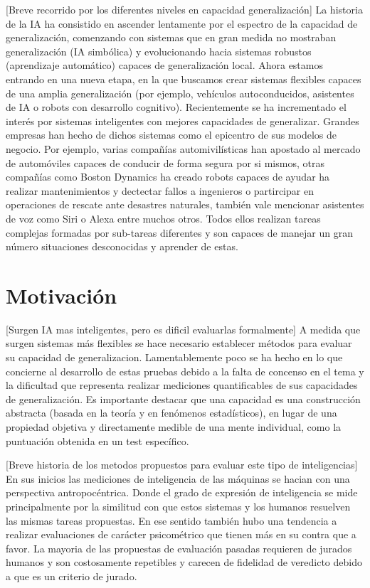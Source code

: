 [Breve recorrido por los diferentes niveles en capacidad generalización]
La historia de la IA ha consistido en ascender lentamente por el espectro de la capacidad de generalización, comenzando con sistemas que en gran medida no mostraban generalización (IA simbólica) y evolucionando hacia sistemas robustos (aprendizaje automático) capaces de generalización local. Ahora estamos entrando en una nueva etapa, en la que buscamos crear sistemas flexibles capaces de una amplia generalización (por ejemplo, vehículos autoconducidos, asistentes de IA o robots con desarrollo cognitivo). Recientemente se ha incrementado el interés por sistemas inteligentes con mejores capacidades de generalizar. Grandes empresas han hecho de dichos sistemas como el epicentro de sus modelos de negocio. Por ejemplo, varias compañías automivilísticas han apostado al mercado de automóviles capaces de conducir de forma segura por si mismos, otras compañías como Boston Dynamics ha creado robots capaces de ayudar ha realizar mantenimientos y dectectar fallos a ingenieros o partircipar en operaciones de rescate ante desastres naturales, también vale mencionar asistentes de voz como Siri o Alexa entre muchos otros. Todos ellos realizan tareas complejas formadas por sub-tareas diferentes y son capaces de manejar un gran número situaciones desconocidas y aprender de estas.

\section*{Motivación}

[Surgen IA mas inteligentes, pero es dificil evaluarlas formalmente]
A medida que surgen sistemas más flexibles se hace necesario establecer métodos para evaluar su capacidad de generalizacion. Lamentablemente poco se ha hecho en lo que concierne al desarrollo de estas pruebas debido a la falta de concenso en el tema y la dificultad que representa realizar mediciones quantificables de sus capacidades de generalización. Es importante destacar que una capacidad es una construcción abstracta (basada en la teoría y en fenómenos estadísticos), en lugar de una propiedad objetiva y directamente medible de una mente individual, como la puntuación obtenida en un test específico.

[Breve historia de los metodos propuestos para evaluar este tipo de inteligencias]
En sus inicios las mediciones de inteligencia de las máquinas se hacian con una perspectiva antropocéntrica. Donde el grado de expresión de inteligencia se mide principalmente por la similitud con que estos sistemas y los humanos resuelven las mismas tareas propuestas. En ese sentido también hubo una tendencia a realizar evaluaciones de carácter psicométrico que tienen más en su contra que a favor. La mayoria de las propuestas de evaluación pasadas requieren de jurados humanos y son costosamente repetibles y carecen de fidelidad de veredicto debido a que es un criterio de jurado.


